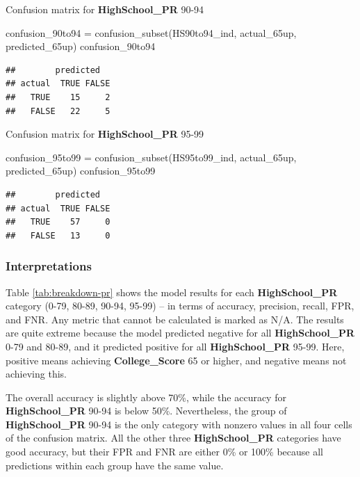 \documentclass[
]{article}
\newenvironment{Shaded}{\begin{snugshade}}{\end{snugshade}}
\newcommand{\FunctionTok}[1]{\textcolor[rgb]{0.00,0.00,0.00}{#1}}
\newcommand{\NormalTok}[1]{#1}
\newcommand{\OtherTok}[1]{\textcolor[rgb]{0.56,0.35,0.01}{#1}}
\begin{document}
Confusion matrix for \textbf{HighSchool\_PR} 90-94

\begin{Shaded}
\begin{Highlighting}[]
\NormalTok{confusion\_90to94 }\OtherTok{=} \FunctionTok{confusion\_subset}\NormalTok{(HS90to94\_ind, actual\_65up, predicted\_65up)}
\NormalTok{confusion\_90to94}
\end{Highlighting}
\end{Shaded}

\begin{verbatim}
##        predicted
## actual  TRUE FALSE
##   TRUE    15     2
##   FALSE   22     5
\end{verbatim}

Confusion matrix for \textbf{HighSchool\_PR} 95-99

\begin{Shaded}
\begin{Highlighting}[]
\NormalTok{confusion\_95to99 }\OtherTok{=} \FunctionTok{confusion\_subset}\NormalTok{(HS95to99\_ind, actual\_65up, predicted\_65up)}
\NormalTok{confusion\_95to99}
\end{Highlighting}
\end{Shaded}

\begin{verbatim}
##        predicted
## actual  TRUE FALSE
##   TRUE    57     0
##   FALSE   13     0
\end{verbatim}

\hypertarget{segment-interpret}{%
\subsubsection{Interpretations}\label{segment-interpret}}

Table \ref{tab:breakdown-pr} shows the model results for each
\textbf{HighSchool\_PR} category (0-79, 80-89, 90-94, 95-99) -- in terms
of accuracy, precision, recall, FPR, and FNR. Any metric that cannot be
calculated is marked as N/A. The results are quite extreme because the
model predicted negative for all \textbf{HighSchool\_PR} 0-79 and 80-89,
and it predicted positive for all \textbf{HighSchool\_PR} 95-99. Here,
positive means achieving \textbf{College\_Score} 65 or higher, and
negative means not achieving this.

The overall accuracy is slightly above 70\%, while the accuracy for
\textbf{HighSchool\_PR} 90-94 is below 50\%. Nevertheless, the group of
\textbf{HighSchool\_PR} 90-94 is the only category with nonzero values
in all four cells of the confusion matrix. All the other three
\textbf{HighSchool\_PR} categories have good accuracy, but their FPR and
FNR are either 0\% or 100\% because all predictions within each group
have the same value.
\end{document}

